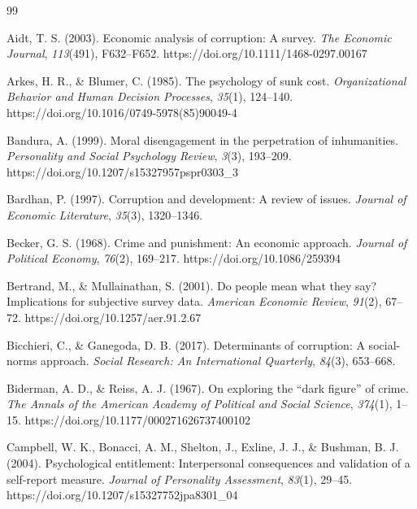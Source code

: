\documentclass[11pt, a4paper]{article}
\begin{document}
\newpage

\begin{thebibliography}{99}

Aidt, T. S. (2003).
\newblock Economic analysis of corruption: A survey.
\newblock \emph{The Economic Journal}, \emph{113}(491), F632--F652.
\newblock https://doi.org/10.1111/1468-0297.00167

Arkes, H. R., \& Blumer, C. (1985).
\newblock The psychology of sunk cost.
\newblock \emph{Organizational Behavior and Human Decision Processes}, \emph{35}(1), 124--140.
\newblock https://doi.org/10.1016/0749-5978(85)90049-4

Bandura, A. (1999).
\newblock Moral disengagement in the perpetration of inhumanities.
\newblock \emph{Personality and Social Psychology Review}, \emph{3}(3), 193--209.
\newblock https://doi.org/10.1207/s15327957pspr0303\_3

Bardhan, P. (1997).
\newblock Corruption and development: A review of issues.
\newblock \emph{Journal of Economic Literature}, \emph{35}(3), 1320--1346.

Becker, G. S. (1968).
\newblock Crime and punishment: An economic approach.
\newblock \emph{Journal of Political Economy}, \emph{76}(2), 169--217.
\newblock https://doi.org/10.1086/259394

Bertrand, M., \& Mullainathan, S. (2001).
\newblock Do people mean what they say? Implications for subjective survey data.
\newblock \emph{American Economic Review}, \emph{91}(2), 67--72.
\newblock https://doi.org/10.1257/aer.91.2.67

Bicchieri, C., \& Ganegoda, D. B. (2017).
\newblock Determinants of corruption: A social-norms approach.
\newblock \emph{Social Research: An International Quarterly}, \emph{84}(3), 653--668.

Biderman, A. D., \& Reiss, A. J. (1967).
\newblock On exploring the ``dark figure'' of crime.
\newblock \emph{The Annals of the American Academy of Political and Social Science}, \emph{374}(1), 1--15.
\newblock https://doi.org/10.1177/000271626737400102

Campbell, W. K., Bonacci, A. M., Shelton, J., Exline, J. J., \& Bushman, B. J. (2004).
\newblock Psychological entitlement: Interpersonal consequences and validation of a self-report measure.
\newblock \emph{Journal of Personality Assessment}, \emph{83}(1), 29--45.
\newblock https://doi.org/10.1207/s15327752jpa8301\_04


\end{thebibliography}
\end{document}
